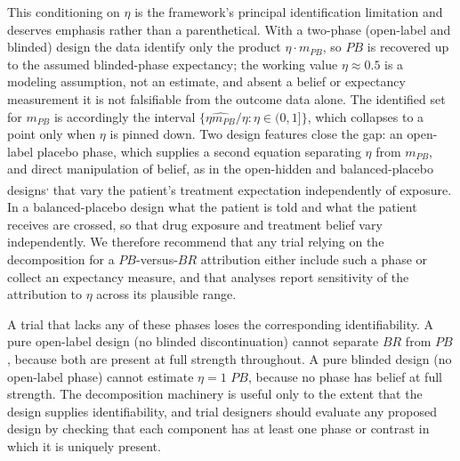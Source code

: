 \documentclass[
  11pt,
]{article}
\begin{document}
This conditioning on \(\eta\) is the framework's principal identification
limitation and deserves emphasis rather than a parenthetical. With a two-phase
(open-label and blinded) design the data identify only the product \(\eta \cdot
m_{PB}\), so \(PB\) is recovered up to the assumed blinded-phase expectancy; the
working value \(\eta \approx 0.5\) is a modeling assumption, not an estimate,
and absent a belief or expectancy measurement it is not falsifiable from the
outcome data alone. The identified set for \(m_{PB}\) is accordingly the
interval \(\{\widehat{\eta m_{PB}} / \eta : \eta \in (0,1]\}\), which collapses
to a point only when \(\eta\) is pinned down. Two design features close the gap:
an open-label placebo phase, which supplies a second equation separating
\(\eta\) from \(m_{PB}\), and direct manipulation of belief, as in the open-hidden
and balanced-placebo designs\textsuperscript{,} that vary the
patient's treatment expectation independently of exposure. In a balanced-placebo design what
the patient is told and what the patient receives are crossed, so that drug
exposure and treatment belief vary independently. We therefore recommend that
any trial relying on the decomposition for a \(PB\)-versus-\(BR\) attribution
either include such a phase or collect an expectancy measure, and that
analyses report sensitivity of the attribution to \(\eta\) across its plausible
range.

A trial that lacks any of these phases loses the corresponding
identifiability. A pure open-label design (no blinded discontinuation) cannot
separate \(BR\) from \(PB\), because both are present at full strength throughout.
A pure blinded design (no open-label phase) cannot estimate \(\eta = 1\) \(PB\),
because no phase has belief at full strength. The decomposition machinery is
useful only to the extent that the design supplies identifiability, and trial
designers should evaluate any proposed design by checking that each component
has at least one phase or contrast in which it is uniquely present.
\end{document}
